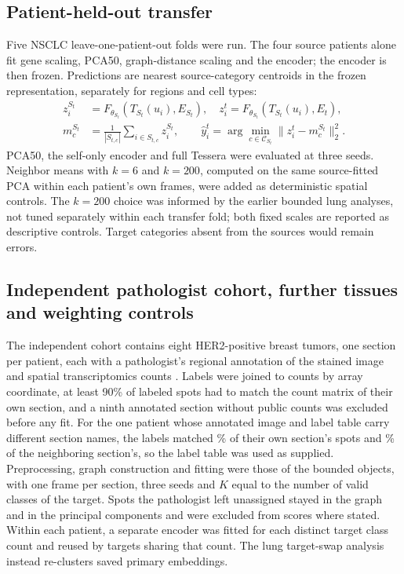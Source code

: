 \documentclass[11pt]{article}
\begin{document}
\subsection{Patient-held-out transfer}
Five NSCLC leave-one-patient-out folds were run. The four source patients alone fit gene scaling, PCA50, graph-distance scaling and the encoder; the encoder is then frozen. Predictions are nearest source-category centroids in the frozen representation, separately for regions and cell types:
\begin{align}
z_i^{S_t}&=F_{\theta_{S_t}}(T_{S_t}(u_i),E_{S_t}),\quad
z_i^t=F_{\theta_{S_t}}(T_{S_t}(u_i),E_t),\label{eq:transfer}\\
m_c^{S_t}&=\frac{1}{|S_{t,c}|}\sum_{i\in S_{t,c}}z_i^{S_t},\qquad
\widehat y_i^t=\arg\min_{c\in\mathcal C_{S_t}}\lVert z_i^t-m_c^{S_t}\rVert_2^2.\label{eq:centroid}
\end{align}
PCA50, the self-only encoder and full Tessera were evaluated at three seeds. Neighbor means with \(k=6\) and \(k=200\), computed on the same source-fitted PCA within each patient's own frames, were added as deterministic spatial controls. The \(k=200\) choice was informed by the earlier bounded lung analyses, not tuned separately within each transfer fold; both fixed scales are reported as descriptive controls. Target categories absent from the sources would remain errors.

\subsection{Independent pathologist cohort, further tissues and weighting controls}
The independent cohort contains eight HER2-positive breast tumors, one section per patient, each with a pathologist's regional annotation of the stained image and spatial transcriptomics counts \citep{andersson2021her2st}. Labels were joined to counts by array coordinate, at least 90\% of labeled spots had to match the count matrix of their own section, and a ninth annotated section without public counts was excluded before any fit. For the one patient whose annotated image and label table carry different section names, the labels matched \HerGOwn\% of their own section's spots and \HerGOther\% of the neighboring section's, so the label table was used as supplied. Preprocessing, graph construction and fitting were those of the bounded objects, with one frame per section, three seeds and \(K\) equal to the number of valid classes of the target. Spots the pathologist left unassigned stayed in the graph and in the principal components and were excluded from scores where stated. Within each patient, a separate encoder was fitted for each distinct target class count and reused by targets sharing that count. The lung target-swap analysis instead re-clusters saved primary embeddings.
\end{document}
